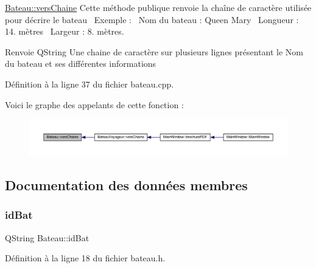 \hyperlink{class_bateau_a392f6a45649a2a35186dfcd1ca58eddc}{Bateau\+::vers\+Chaine} Cette méthode publique renvoie la chaîne de caractère utilisée pour décrire le bateau~\newline
Exemple \+:~\newline
Nom du bateau \+: Queen Mary~\newline
Longueur \+: 14. mètres~\newline
Largeur \+: 8. mètres. 

\begin{DoxyReturn}{Renvoie}
Q\+String Une chaine de caractère sur plusieurs lignes présentant le Nom du bateau et ses différentes informations 
\end{DoxyReturn}


Définition à la ligne 37 du fichier bateau.\+cpp.

Voici le graphe des appelants de cette fonction \+:\nopagebreak
\begin{figure}[H]
\begin{center}
\leavevmode
\includegraphics[width=350pt]{class_bateau_a392f6a45649a2a35186dfcd1ca58eddc_icgraph}
\end{center}
\end{figure}


\subsection{Documentation des données membres}
\mbox{\label{class_bateau_acf710114558ee740be62211df06133e1}} 
\subsubsection{\texorpdfstring{id\+Bat}{idBat}}
{\footnotesize\ttfamily Q\+String Bateau\+::id\+Bat\hspace{0.3cm}{\ttfamily [private]}}



Définition à la ligne 18 du fichier bateau.\+h.

\mbox{\label{class_bateau_ace3ced3b9bb6506a913645230b85022c}} 
